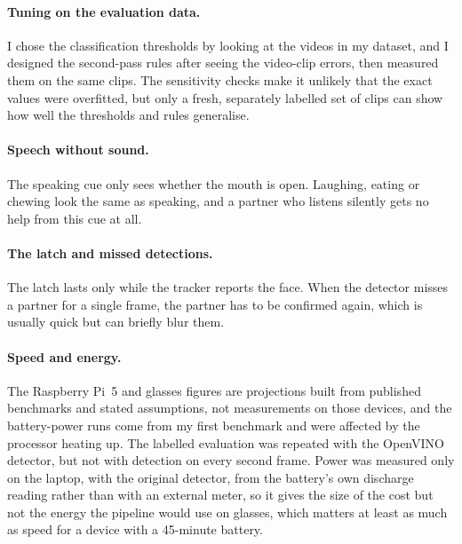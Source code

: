 \paragraph{Tuning on the evaluation data.}
I chose the classification thresholds by looking at the videos in my dataset, and I designed the
second-pass rules after seeing the video-clip errors, then measured them on the same clips.
The sensitivity checks make it unlikely that the exact values were overfitted, but only a
fresh, separately labelled set of clips can show how well the thresholds and rules
generalise.

\paragraph{Speech without sound.}
The speaking cue only sees whether the mouth is open. Laughing, eating or chewing look the
same as speaking, and a partner who listens silently gets no help from this cue at all.

\paragraph{The latch and missed detections.}
The latch lasts only while the tracker reports the face. When the detector misses a partner
for a single frame, the partner has to be confirmed again, which is usually quick but can
briefly blur them.

\paragraph{Speed and energy.}
The Raspberry Pi~5 and glasses figures are projections built from published benchmarks
and stated assumptions, not measurements on those devices, and the battery-power runs come
from my first benchmark and were affected by the processor heating up. The labelled evaluation was repeated with the OpenVINO detector, but not with detection on
every second frame. Power was measured only on the laptop, with the original detector,
from the battery's own discharge reading rather than with an external meter, so it gives
the size of the cost but not the energy the pipeline would use on glasses, which matters at
least as much as speed for a device with a 45-minute battery.
